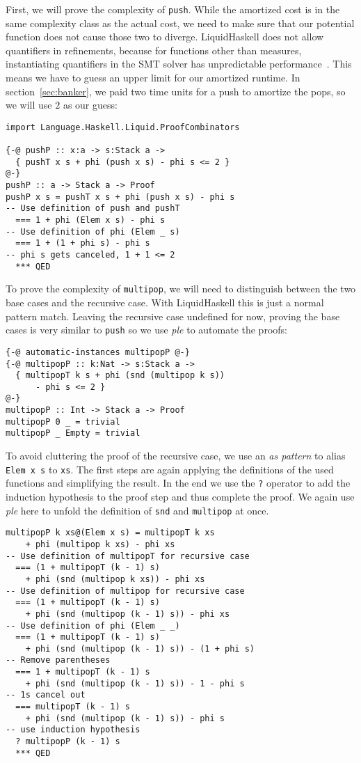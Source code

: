 \documentclass[sigplan,screen]{acmart}
\begin{document}
First, we will prove the complexity of \texttt{push}. While the amortized cost is in the same complexity class as the actual cost, we need to make sure that our potential function does not cause those two to diverge. LiquidHaskell does not allow quantifiers in refinements, because for functions other than measures, instantiating quantifiers in the SMT solver has unpredictable performance~\cite{lh_quantifiers}. This means we have to guess an upper limit for our amortized runtime. In section~\ref{sec:banker}, we paid two time units for a push to amortize the pops, so we will use $2$ as our guess:

\begin{lstlisting}
import Language.Haskell.Liquid.ProofCombinators

{-@ pushP :: x:a -> s:Stack a ->
  { pushT x s + phi (push x s) - phi s <= 2 }
@-}
pushP :: a -> Stack a -> Proof
pushP x s = pushT x s + phi (push x s) - phi s
-- Use definition of push and pushT
  === 1 + phi (Elem x s) - phi s
-- Use definition of phi (Elem _ s)
  === 1 + (1 + phi s) - phi s
-- phi s gets canceled, 1 + 1 <= 2
  *** QED
\end{lstlisting}

To prove the complexity of \texttt{multipop}, we will need to distinguish between the two base cases and the recursive case. With LiquidHaskell this is just a normal pattern match. Leaving the recursive case undefined for now, proving the base cases is very similar to \texttt{push} so we use \textit{ple} to automate the proofs:

\begin{lstlisting}
{-@ automatic-instances multipopP @-}
{-@ multipopP :: k:Nat -> s:Stack a ->
  { multipopT k s + phi (snd (multipop k s))
      - phi s <= 2 }
@-}
multipopP :: Int -> Stack a -> Proof
multipopP 0 _ = trivial
multipopP _ Empty = trivial
\end{lstlisting}

To avoid cluttering the proof of the recursive case, we use an \textit{as pattern} to alias \texttt{Elem x s} to \texttt{xs}. The first steps are again applying the definitions of the used functions and simplifying the result. In the end we use the \texttt{?} operator to add the induction hypothesis to the proof step and thus complete the proof. We again use \textit{ple} here to unfold the definition of \texttt{snd} and \texttt{multipop} at once.

\begin{lstlisting}
multipopP k xs@(Elem x s) = multipopT k xs
    + phi (multipop k xs) - phi xs
-- Use definition of multipopT for recursive case
  === (1 + multipopT (k - 1) s)
    + phi (snd (multipop k xs)) - phi xs
-- Use definition of multipop for recursive case
  === (1 + multipopT (k - 1) s)
    + phi (snd (multipop (k - 1) s)) - phi xs
-- Use definition of phi (Elem _ _)
  === (1 + multipopT (k - 1) s)
    + phi (snd (multipop (k - 1) s)) - (1 + phi s)
-- Remove parentheses
  === 1 + multipopT (k - 1) s
    + phi (snd (multipop (k - 1) s)) - 1 - phi s
-- 1s cancel out
  === multipopT (k - 1) s
    + phi (snd (multipop (k - 1) s)) - phi s
-- use induction hypothesis
  ? multipopP (k - 1) s
  *** QED
\end{lstlisting}
\end{document}
